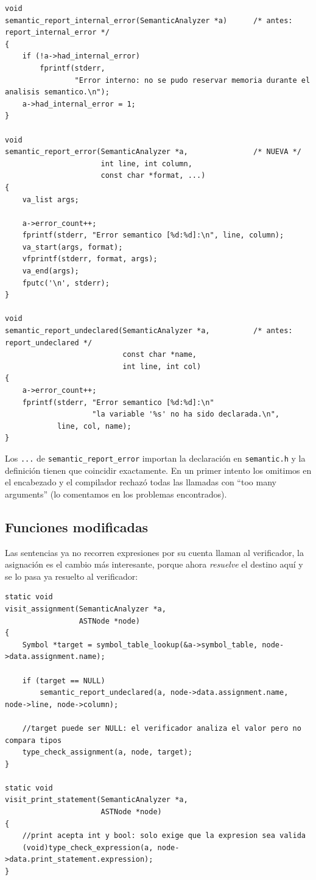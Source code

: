 \documentclass[12pt,letterpaper]{article}
\begin{document}
\begin{lstlisting}[style=modernc, caption={\texttt{semantic.c}: funciones de diagnóstico públicas.}]
void
semantic_report_internal_error(SemanticAnalyzer *a)      /* antes: report_internal_error */
{
    if (!a->had_internal_error)
        fprintf(stderr,
                "Error interno: no se pudo reservar memoria durante el analisis semantico.\n");
    a->had_internal_error = 1;
}

void
semantic_report_error(SemanticAnalyzer *a,               /* NUEVA */
                      int line, int column,
                      const char *format, ...)
{
    va_list args;

    a->error_count++;
    fprintf(stderr, "Error semantico [%d:%d]:\n", line, column);
    va_start(args, format);
    vfprintf(stderr, format, args);
    va_end(args);
    fputc('\n', stderr);
}

void
semantic_report_undeclared(SemanticAnalyzer *a,          /* antes: report_undeclared */
                           const char *name,
                           int line, int col)
{
    a->error_count++;
    fprintf(stderr, "Error semantico [%d:%d]:\n"
                    "la variable '%s' no ha sido declarada.\n",
            line, col, name);
}
\end{lstlisting}

\bigskip

Los \texttt{...} de \texttt{semantic\_report\_error} importan la declaración en \texttt{semantic.h} y la
definición tienen que coincidir exactamente. En un primer intento los omitimos en el encabezado y el compilador
rechazó todas las llamadas con ``too many arguments'' (lo comentamos en los problemas encontrados).

\subsection*{Funciones modificadas}

Las sentencias ya no recorren expresiones por su cuenta llaman al verificador, la asignación es el cambio más
interesante, porque ahora \emph{resuelve} el destino aquí y se lo pasa ya resuelto al verificador:

\begin{lstlisting}[style=modernc, caption={\texttt{semantic.c}: \texttt{visit\_assignment} y \texttt{visit\_print\_statement}.}]
static void
visit_assignment(SemanticAnalyzer *a,
                 ASTNode *node)
{
    Symbol *target = symbol_table_lookup(&a->symbol_table, node->data.assignment.name);

    if (target == NULL)
        semantic_report_undeclared(a, node->data.assignment.name, node->line, node->column);

    //target puede ser NULL: el verificador analiza el valor pero no compara tipos
    type_check_assignment(a, node, target);
}

static void
visit_print_statement(SemanticAnalyzer *a,
                      ASTNode *node)
{
    //print acepta int y bool: solo exige que la expresion sea valida
    (void)type_check_expression(a, node->data.print_statement.expression);
}
\end{lstlisting}
\end{document}
